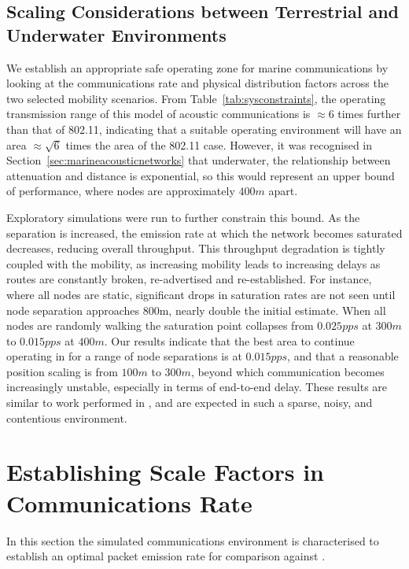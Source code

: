 \subsection{Scaling Considerations between Terrestrial and Underwater Environments}

We establish an appropriate safe operating zone for marine communications by looking at the communications rate and physical distribution factors across the two selected mobility scenarios.
From Table~\ref{tab:sysconstraints}, the operating transmission range of this model of acoustic communications is $\approx 6$ times further than that of 802.11, indicating that a suitable operating environment will have an area $\approx \sqrt{6}$ times the area of the 802.11 case.
However, it was recognised in Section~\ref{sec:marineacousticnetworks} that underwater, the relationship between attenuation and distance is exponential, so this would represent an upper bound of performance, where nodes are approximately $400m$ apart. 

Exploratory simulations were run to further constrain this bound.
As the separation is increased, the emission rate at which the network becomes saturated decreases, reducing overall throughput. 
This throughput degradation is tightly coupled with the mobility, as increasing mobility leads to increasing delays as routes are constantly broken, re-advertised and re-established. 
For instance, where all nodes are static, significant drops in saturation rates are not seen until node separation approaches 800m, nearly double the initial estimate. 
When all nodes are randomly walking the saturation point collapses from $0.025pps$ at $300m$ to $0.015pps$ at $400m$.
Our results indicate that the best area to continue operating in for a range of node separations is at $0.015pps$, and that a reasonable position scaling is from $100m$ to $300m$, beyond which communication becomes increasingly unstable, especially in terms of end-to-end delay.
These results are similar to work performed in \cite{Miquel2008}, and are expected in such a sparse, noisy, and contentious environment. 



\section{Establishing Scale Factors in Communications Rate}

In this section the simulated communications environment is characterised to establish an optimal packet emission rate for comparison against \cite{Guo11}.


